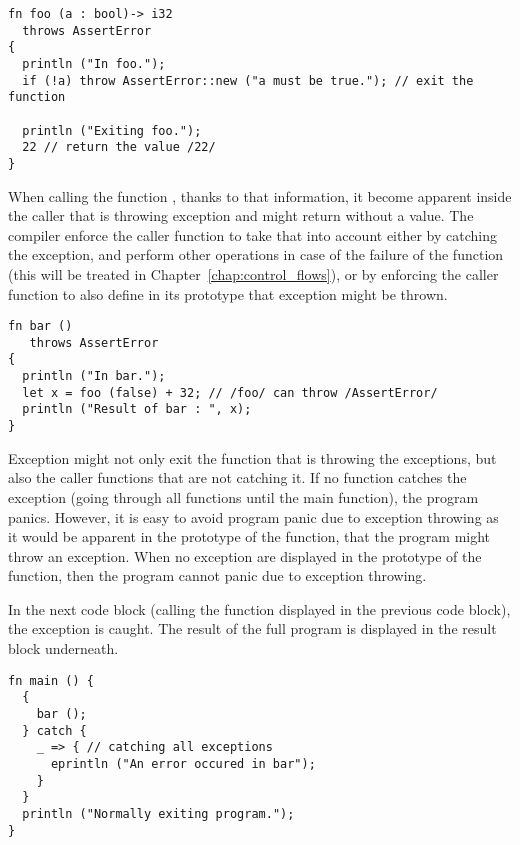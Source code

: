 \begin{lstlisting}[style=coloredverbatim]
fn foo (a : bool)-> i32
  throws AssertError
{
  println ("In foo.");
  if (!a) throw AssertError::new ("a must be true."); // exit the function

  println ("Exiting foo.");
  22 // return the value /22/
}
\end{lstlisting}


When calling the function , thanks to that information, it become
apparent inside the caller that  is throwing exception and might
return without a value. The compiler enforce the caller function to take that
into account either by catching the exception, and perform other operations in
case of the failure of the function  (this will be treated in
Chapter~\ref{chap:control_flows}), or by enforcing the caller function to also
define in its prototype that exception might be thrown.


\begin{lstlisting}[style=coloredverbatim]
fn bar ()
   throws AssertError
{
  println ("In bar.");
  let x = foo (false) + 32; // /foo/ can throw /AssertError/
  println ("Result of bar : ", x);
}
\end{lstlisting}

Exception might not only exit the function that is throwing the exceptions, but
also the caller functions that are not catching it. If no function catches the
exception (going through all functions until the main function), the program
panics. However, it is easy to avoid program panic due to exception throwing as
it would be apparent in the prototype of the  function, that the
program might throw an exception. When no exception are displayed in the
prototype of the  function, then the program cannot panic due to
exception throwing.

In the next code block (calling the  function displayed in the
previous code block), the exception is caught. The result of the full program is
displayed in the result block underneath.




\begin{lstlisting}[style=coloredverbatim]
fn main () {
  {
    bar ();
  } catch {
    _ => { // catching all exceptions
      eprintln ("An error occured in bar");
    }
  }
  println ("Normally exiting program.");
}
\end{lstlisting}

